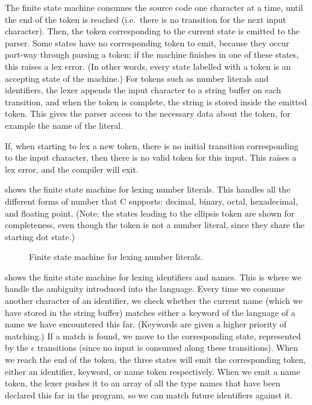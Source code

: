 \documentclass[00-main.tex]{subfiles}
\begin{document}
The finite state machine consumes the source code one character at a time, until the end of the token is reached (i.e.\ there is no transition for the next input character).
Then, the token corresponding to the current state is emitted to the parser.
Some states have no corresponding token to emit, because they occur part-way through parsing a token; if the machine finishes in one of these states, this raises a lex error.
(In other words, every state labelled with a token is an accepting state of the machine.)
For tokens such as number literals and identifiers, the lexer appends the input character to a string buffer on each transition, and when the token is complete, the string is stored inside the emitted token.
This gives the parser access to the necessary data about the token, for example the name of the literal.

If, when starting to lex a new token, there is no initial transition corresponding to the input character, then there is no valid token for this input. This raises a lex error, and the compiler will exit.

 shows the finite state machine for lexing number literals. This handles all the different forms of number that C supports: decimal, binary, octal, hexadecimal, and floating point.
(Note: the states leading to the ellipsis token are shown for completeness, even though the token is not a number literal, since they share the starting dot state.)

\begin{figure}[ht]
  \centering
  \caption{Finite state machine for lexing number literals.}
  \label{fig:lexing numbers fsm}
\end{figure}

 shows the finite state machine for lexing identifiers and  names.
This is where we handle the ambiguity introduced into the language.
  Every time we consume another character of an identifier, we check whether the current name (which we have stored in the string buffer) matches either a keyword of the language of a  name we have encountered this far.
(Keywords are given a higher priority of matching.)
  If a match is found, we move to the corresponding state, represented by the $\epsilon$ transitions (since no input is consumed along these transitions).
When we reach the end of the token, the three states will emit the corresponding token, either an identifier, keyword, or  name token respectively.
When we emit a  name token, the lexer pushes it to an array of all the type names that have been declared this far in the program, so we can match future identifiers against it.
\end{document}
